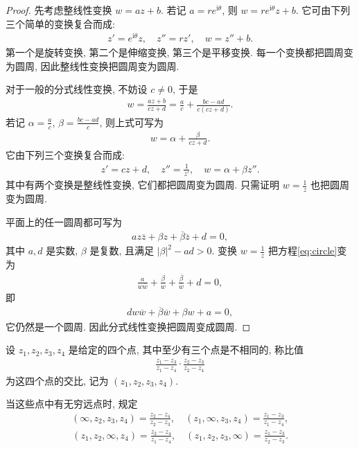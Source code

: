 \documentclass[../../main.tex]{subfiles}%
\begin{document}
\begin{proof}
先考虑整线性变换 $w = az+b$. 若记 $a = re^{\mathrm{i}\theta }$, 则 $w = re^{\mathrm{i}\theta }z + b$. 它可由下列三个简单的变换复合而成:
\begin{align*}
z' = e^{\mathrm{i}\theta }z, \quad z'' = rz', \quad w = z''+b.
\end{align*}
第一个是旋转变换, 第二个是伸缩变换, 第三个是平移变换. 每一个变换都把圆周变为圆周, 因此整线性变换把圆周变为圆周.

对于一般的分式线性变换, 不妨设 $c \neq 0$, 于是
\begin{align*}
w = \frac{az+b}{cz+d} = \frac{a}{c} + \frac{bc-ad}{c(cz+d)}.
\end{align*}
若记 $\alpha = \frac{a}{c}$, $\beta = \frac{bc-ad}{c}$, 则上式可写为
\begin{align*}
w = \alpha + \frac{\beta}{cz+d}.
\end{align*}
它由下列三个变换复合而成:
\begin{align*}
z' = cz+d, \quad z'' = \frac{1}{z'}, \quad w = \alpha + \beta z''.
\end{align*}
其中有两个变换是整线性变换, 它们都把圆周变为圆周. 只需证明 $w = \frac{1}{z}$ 也把圆周变为圆周.

平面上的任一圆周都可写为
\begin{align}
az\overline{z} + \beta z + \overline{\beta}\overline{z} + d = 0, \label{eq:circle}
\end{align}
其中 $a,d$ 是实数, $\beta$ 是复数, 且满足 $|\beta|^2 - ad > 0$. 变换 $w = \frac{1}{z}$ 把方程\eqref{eq:circle}变为
\begin{align*}
\frac{a}{w\overline{w}} + \frac{\beta}{w} + \frac{\overline{\beta}}{\overline{w}} + d = 0,
\end{align*}
即
\begin{align*}
dw\overline{w} + \overline{\beta}\overline{w} + \beta w + a = 0,
\end{align*}
它仍然是一个圆周. 因此分式线性变换把圆周变成圆周.
\end{proof}

\begin{definition}
设 $z_1,z_2,z_3,z_4$ 是给定的四个点, 其中至少有三个点是不相同的, 称比值
\begin{align*}
\frac{z_1-z_3}{z_1-z_4} \cdot \frac{z_2-z_3}{z_2-z_4}
\end{align*}
为这四个点的交比, 记为 $(z_1,z_2,z_3,z_4)$.

当这些点中有无穷远点时, 规定
\begin{align*}
(\infty,z_2,z_3,z_4) = \frac{z_2-z_4}{z_2-z_3}, \quad
(z_1,\infty,z_3,z_4) = \frac{z_1-z_3}{z_1-z_4},
\end{align*}
\begin{align*}
(z_1,z_2,\infty,z_4) = \frac{z_2-z_4}{z_1-z_4}, \quad
(z_1,z_2,z_3,\infty) = \frac{z_1-z_3}{z_2-z_3}.
\end{align*}
\end{definition}
\end{document}
